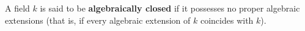 A field $k$ is said to be \textbf{algebraically closed} if it possesses no proper algebraic extensions (that is, if every algebraic extension of $k$ coincides with $k$).
